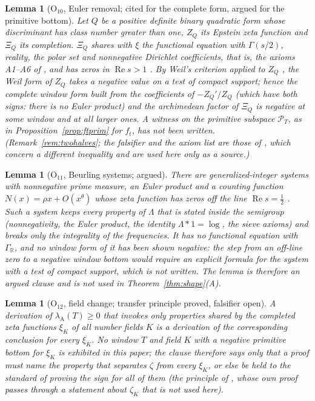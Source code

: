 \documentclass[11pt]{amsart}
\newtheorem{lemma}[theorem]{Lemma}
\theoremstyle{definition}
\theoremstyle{remark}
\newcommand{\R}{\mathbb R}
\newcommand{\Rel}{\operatorname{Re}}
\newcommand{\PT}{\mathcal P_T}
\newcommand{\lamA}{\lambda_{\mathrm A}(T)}
\begin{document}
\begin{lemma}[$\mathrm O_{10}$, Euler removal; cited for the complete form, argued for the primitive bottom]\label{lem:shape-epstein}
Let $Q$ be a positive definite binary quadratic form whose discriminant has class number greater than one, $Z_Q$ its Epstein zeta
function and $\Xi_Q$ its completion. $\Xi_Q$ shares with $\xi$ the functional equation with $\Gamma(s/2)$, reality, the polar set and
nonnegative Dirichlet coefficients, that is, the axioms A1--A6 of \cite{Paper46}, and has zeros in $\Rel s>1$
\cite{DavenportHeilbronn1936}. By Weil's criterion applied to $Z_Q$ \cite{Weil52}, the Weil form of $Z_Q$ takes a negative value on a
test of compact support; hence the complete window form built from the coefficients of $-Z_Q'/Z_Q$ (which have both signs: there is no
Euler product) and the archimedean factor of $\Xi_Q$ is negative at some window and at all larger ones. A witness on the primitive
subspace $\PT$, as in Proposition~\ref{prop:ftprim} for $f_t$, has not been written. (Remark~\ref{rem:twohalves}; the falsifier and the
axiom list are those of \cite[Thms.~18.10, 18.16]{Paper46}, which concern a different inequality and are used here only as a source.)
\end{lemma}

\begin{lemma}[$\mathrm O_{11}$, Beurling systems; argued]\label{lem:shape-beurling}
There are generalized-integer systems with nonnegative prime measure, an Euler product and a counting function $N(x)=\rho x+O(x^\theta)$
whose zeta function has zeros off the line $\Rel s=\frac12$ \cite{DiamondZhang2016}. Such a system keeps every property of $\Lambda$ that is
stated inside the semigroup (nonnegativity, the Euler product, the identity $\Lambda*1=\log$, the sieve axioms) and breaks only the
integrality of the frequencies. It has no functional equation with $\Gamma_\R$, and no window form of it has been shown negative: the
step from an off-line zero to a negative window bottom would require an explicit formula for the system with a test of compact support,
which is not written. The lemma is therefore an argued clause and is not used in Theorem~\ref{thm:shape}(A).
\end{lemma}

\begin{lemma}[$\mathrm O_{12}$, field change; transfer principle proved, falsifier open]\label{lem:shape-field}
A derivation of $\lamA\ge0$ that invokes only properties shared by the completed zeta functions $\xi_K$ of all number fields $K$ is a
derivation of the corresponding conclusion for every $\xi_K$. No window $T$ and field $K$ with a negative primitive bottom for $\xi_K$
is exhibited in this paper; the clause therefore says only that a proof must name the property that separates $\zeta$ from every
$\xi_K$, or else be held to the standard of proving the sign for all of them (the principle of \cite[Thm.~18.1]{Paper46}, whose own
proof passes through a statement about $\zeta_K$ that is not used here).
\end{lemma}
\end{document}
